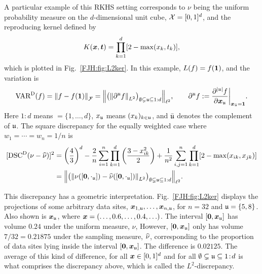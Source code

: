 \documentclass[graybox,footinfo]{svmult}
\begin{document}
A particular example of this RKHS setting corresponds to 
$\nu$ being the uniform probability measure on the $d$-dimensional unit cube, ${\mathcal{X}} 
= 
[0,1]^d$, and the reproducing kernel defined by \cite{Hic97a}
\begin{equation} \label{FJH:eq:L2Kdef}
K(\bsx,\bst) =\prod_{k = 1}^d [2 - \max(x_k,t_k)],
\end{equation}
which is plotted in Fig.\ \ref{FJH:fig:L2ker}.  In this example, $L(f) = f({\boldsymbol{1}})$, and the 
variation is 
\begin{equation*}
\textup{VAR}^{\textup{D}}(f)  = \left \lVert f-f({\boldsymbol{1}}) \right \rVert_{\mathcal{F}} = \Bigl \lVert \bigl ( \left \lVert \partial^{\mathfrak{u}} 
f \right \rVert_{L^2}\bigr 
)_{\emptyset \subsetneq {\mathfrak{u}} \subseteq 1:d} \Bigr \rVert_{\ell^2} , \qquad 
\partial^{\mathfrak{u}} f : = \frac{\partial^{\lvert{\mathfrak{u}}\rvert} f}{\partial {\boldsymbol{x}}_{\mathfrak{u}}} \biggr 
\rvert_{{\boldsymbol{x}}_{\bar{{\mathfrak{u}}}} = {\boldsymbol{1}}}.
\end{equation*}
Here $1\!:\!d$ means  $= \{1, \ldots, d\}$, $x_{\mathfrak{u}}$ means $(x_k)_{k \in {\mathfrak{u}}}$, and 
$\bar{{\mathfrak{u}}}$ 
denotes the complement of ${\mathfrak{u}}$.  
The square discrepancy for the equally weighted case where $w_1 = \cdots = w_n = 1/n$ 
is
\begin{align}
\nonumber
[\disc^\Dt(\nu - \hnu)]^2  &= \left(\frac 43\right)^d - \frac{2}n \sum_{i=1}^n \prod_{k=1}^d 
\left (\frac{3 - x_{ik}^2}{2} \right) + \frac{1}{n^2}\sum_{i,j=1}^n \prod_{k = 1}^d [2 - 
\max(x_{ik},x_{jk})] 
\\ &= \Bigl \lVert \bigl ( \norm{\nu([\bszero,\cdot_\fraku]) - 
	\hnu([\bszero,\cdot_\fraku])}_{L^2}\bigr )_{\emptyset \subsetneq \fraku \subseteq 1:d} 
	\Bigr 
	\rVert_{\ell^2}. \label{FJH:eq:L2disc}
\end{align}

This discrepancy has a geometric interpretation. Fig.\ \ref{FJH:fig:L2ker} displays the 
projections of some arbitrary 
data sites, ${\boldsymbol{x}}_{1,{\mathfrak{u}}}, \ldots, {\boldsymbol{x}}_{n,{\mathfrak{u}}}$, for $n=32$ and ${\mathfrak{u}} = \{5,8\}$.  
Also 
shown is ${\boldsymbol{x}}_{\mathfrak{u}}$, where ${\boldsymbol{x}} = (\ldots, 0.6, \ldots, 0.4, \ldots)$. The interval 
$[{\boldsymbol{0}},{\boldsymbol{x}}_{\mathfrak{u}}]$ has volume $0.24$ under the uniform measure, $\nu$, However, 
$[{\boldsymbol{0}},{\boldsymbol{x}}_{\mathfrak{u}}]$ only has 
volume $7/32 = 0.21875$ under the sampling measure, $\widehat{\nu}$, corresponding to the 
proportion of data sites lying inside the interval $[{\boldsymbol{0}},{\boldsymbol{x}}_{\mathfrak{u}}]$. The difference is 
$0.02125$.  The average of this kind of difference, for all ${\boldsymbol{x}} \in [0,1]^d$ and for all 
$\emptyset \subsetneq {\mathfrak{u}} 
\subseteq 1\!:\!d$ is what comprises the discrepancy above, which is called the 
$L^2$-discrepancy.
\end{document}
